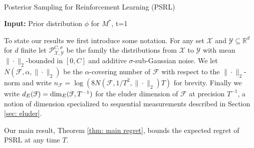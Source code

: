 \documentclass{article}
\newcommand{\Real}{\mathds{R}}
\newcommand{\Xc}{\mathcal{X}}
\newcommand{\Yc}{\mathcal{Y}}
\newcommand{\Pc}{\mathcal{P}}
\newcommand{\Fc}{\mathcal{F}}
\begin{document}
\begin{algorithm}[H]
\caption{\protect\\ Posterior Sampling for Reinforcement Learning (PSRL)}
\label{alg: PS}
{\small
\begin{algorithmic}[1]
    \State \textbf{Input: }Prior distribution $\phi$ for $M^*$, t=1
	    \EndFor
	\EndFor
\end{algorithmic}
}
\end{algorithm}

To state our results we first introduce some notation.
For any set $\Xc$ and $\Yc \subseteq \Real^d$ for $d$ finite let $\Pc^{C,\sigma}_{\Xc,\Yc}$ be the family the distributions from $\Xc$ to $\Yc$ with mean $\|\cdot\|_2$-bounded in $[0,C]$ and additive $\sigma$-sub-Gaussian noise.
We let $N(\Fc,\alpha,\|\cdot\|_2)$ be the $\alpha$-covering number of $\Fc$ with respect to the $\|\cdot\|_2$-norm and write $n_\Fc = \log(8 N(\Fc,1/T^2,\|\cdot\|_2)T)$ for brevity.
Finally we  write $d_E(\Fc) = {\rm dim}_E(\Fc,T^{-1})$ for the eluder dimension of $\Fc$ at precision $T^{-1}$, a notion of dimension specialized to sequential measurements described in Section \ref{sec: eluder}.

Our main result, Theorem \ref{thm: main regret}, bounds the expected regret of PSRL at any time $T$.
\end{document}
